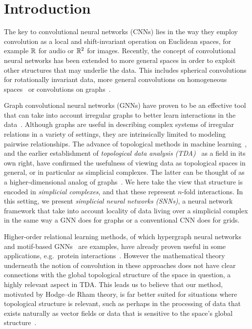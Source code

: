 \section{Introduction}

The key to convolutional neural networks (CNNs) lies in the way they employ convolution as a local and shift-invariant operation on Euclidean spaces, for example $\mathbb{R}$ for audio or $\mathbb{R}^2$ for images. Recently, the concept of convolutional neural networks has been extended to more general spaces in order to exploit other structures that may underlie the data. This includes spherical convolutions~\cite{cohen2016group} for rotationally invariant data, more general convolutions on homogeneous spaces~\cite{cohen2019general} or convolutions on graphs~\cite{defferrard2016convolutional}.

Graph convolutional neural networks (GNNs) have proven to be an effective tool that can take into account irregular graphs to better learn interactions in the data~\cite{bronstein2017geometric, wu2020survey,battaglia2018relational}. Although graphs are useful in describing complex systems of irregular relations in a variety of settings, they are intrinsically limited to modeling pairwise relationships. The advance of topological methods in machine learning~\cite{Gabrielsson2020topological, Hofer2019LearningRO, rieck2018neural}, and the earlier establishment of \emph{topological data analysis (TDA)}~\cite{carlsson2008,chazal2017,edelsbrunner2010computational,ghrist2008barcodes} as a field in its own right, have confirmed the usefulness of viewing data as topological spaces in general, or in particular as simplicial complexes. The latter can be thought of as a higher-dimensional analog of graphs~\cite{moore2012,patania2017}. We here take the view that structure is encoded in \emph{simplicial complexes}, and that these represent $n$-fold interactions. In this setting, we present \emph{simplicial neural networks (SNNs)}, a neural network framework that take into account locality of data living over a simplicial complex in the same way a GNN does for graphs or a conventional CNN does for grids.

Higher-order relational learning methods, of which hypergraph neural networks~\cite{feng2018hypergraphs} and motif-based GNNs~\cite{monti2018motif} are examples, have already proven useful in some applications, e.g.\ protein interactions~\cite{ze2020graph}. However the mathematical theory underneath the notion of convolution in these approaches does not have clear connections with the global topological structure of the space in question, a highly relevant aspect in TDA. This leads us to believe that our method, motivated by Hodge--de Rham theory, is far better suited for situations where topological structure is relevant, such as perhaps in the processing of data that exists naturally as vector fields or data that is sensitive to the space's global structure~\cite{deepsphere}.
